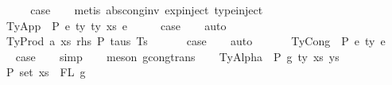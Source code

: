 \begin{isabellebody}
\ \ \isamarkupfalse%
\ \isamarkupfalse%
\ {\isacharquery}{\kern0pt}case\isanewline
\ \ \isamarkupfalse%
\ {\isacharparenleft}{\kern0pt}metis\ abs{\isacharunderscore}{\kern0pt}cong{\isacharunderscore}{\kern0pt}inv\ exp{\isachardot}{\kern0pt}inject{\isacharparenleft}{\kern0pt}{}{\isacharparenright}{\kern0pt}\ type{\isachardot}{\kern0pt}inject{\isacharparenleft}{\kern0pt}{}{\isacharparenright}{\kern0pt}{\isacharparenright}{\kern0pt}\ \isanewline
{}\isamarkupfalse%
\isanewline
\ \ \isamarkupfalse%
\ {\isacharparenleft}{\kern0pt}TyApp\ {\isasymGamma}\ P\ e{}\ ty{}\ ty{}\ xs\ e{}{\isacharparenright}{\kern0pt}\isanewline
\ \ \isamarkupfalse%
\ \isamarkupfalse%
\ {\isacharquery}{\kern0pt}case\isanewline
\ \ \isamarkupfalse%
\ auto\isanewline
\ \ \isamarkupfalse%
\isanewline
{}\isamarkupfalse%
\isanewline
\ \ \isamarkupfalse%
\ {\isacharparenleft}{\kern0pt}TyProd\ a\ xs\ rhs\ P\ taus\ Ts\ {\isasymGamma}{\isacharparenright}{\kern0pt}\isanewline
\ \ \isamarkupfalse%
\ \isamarkupfalse%
\ {\isacharquery}{\kern0pt}case\isanewline
\ \ \isamarkupfalse%
\ auto\isanewline
\ \ \isamarkupfalse%
\isanewline
{}\isamarkupfalse%
\isanewline
\ \ \isamarkupfalse%
\ {\isacharparenleft}{\kern0pt}TyCong\ {\isasymGamma}\ P\ e{}\ ty\ e{}{\isacharparenright}{\kern0pt}\isanewline
\ \ \isamarkupfalse%
\ \isamarkupfalse%
\ {\isacharquery}{\kern0pt}case\isanewline
\ \ \isamarkupfalse%
\ simp\isanewline
\ \ \isamarkupfalse%
\ {\isacharparenleft}{\kern0pt}meson\ gcong{\isachardot}{\kern0pt}trans{\isacharparenright}{\kern0pt}\isanewline
{}\isamarkupfalse%
\isanewline
\ \ \isamarkupfalse%
\ {\isacharparenleft}{\kern0pt}TyAlpha\ {\isasymGamma}{}{\isacharprime}{\kern0pt}\ P\ g\ ty{\isacharprime}{\kern0pt}\ xs{\isacharprime}{\kern0pt}\ ys{\isacharprime}{\kern0pt}{\isacharparenright}{\kern0pt}\isanewline
\ \ \isanewline
\ \ \isamarkupfalse%
\ P{}{\isacharcolon}{\kern0pt}\ {\isachardoublequoteopen}set\ xs{\isacharprime}{\kern0pt}\ {\isacharequal}{\kern0pt}\ FL\ g{\isachardoublequoteclose}\isanewline
\ \ \ \ \isamarkupfalse%

\end{isabellebody}
